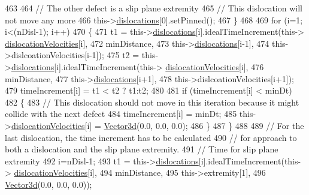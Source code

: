 \begin{DoxyCode}
463 
464        \textcolor{comment}{// The other defect is a slip plane extremity}
465        \textcolor{comment}{// This dislocation will not move any more}
466        this->\hyperlink{classSlipPlane_ad92c7c409f7e161db449528389180910}{dislocations}[0].setPinned();
467      \}
468 
469    \textcolor{keywordflow}{for} (i=1; i<(nDisl-1); i++)
470      \{
471        t1 = this->\hyperlink{classSlipPlane_ad92c7c409f7e161db449528389180910}{dislocations}[i].idealTimeIncrement(this->
      \hyperlink{classSlipPlane_a107a3883169bf918664cb4e4fd4bd72c}{dislocationVelocities}[i],
472                                                      minDistance,
473                                                      this->\hyperlink{classSlipPlane_ad92c7c409f7e161db449528389180910}{dislocations}[i-1],
474                                                      this->dislcoationVelocities[i-1]);
475        t2 = this->\hyperlink{classSlipPlane_ad92c7c409f7e161db449528389180910}{dislocations}[i].idealTimeIncrement(this->
      \hyperlink{classSlipPlane_a107a3883169bf918664cb4e4fd4bd72c}{dislocationVelocities}[i],
476                                                      minDistance,
477                                                      this->\hyperlink{classSlipPlane_ad92c7c409f7e161db449528389180910}{dislocations}[i+1],
478                                                      this->dislcoationVelocities[i+1]);
479        timeIncrement[i] = t1 < t2 ? t1:t2;
480 
481        \textcolor{keywordflow}{if} (timeIncrement[i] < minDt)
482          \{
483            \textcolor{comment}{// This dislocation should not move in this iteration because it might collide with the next
       defect}
484            timeIncrement[i] = minDt;
485            this->\hyperlink{classSlipPlane_a107a3883169bf918664cb4e4fd4bd72c}{dislocationVelocities}[i] = \hyperlink{classVector3d}{Vector3d}(0.0, 0.0, 0.0);
486          \}
487      \}
488 
489    \textcolor{comment}{// For the last dislocation, the time increment has to be calculated}
490    \textcolor{comment}{// for approach to both a dislocation and the slip plane extremity.}
491    \textcolor{comment}{// Time for slip plane extremity}
492    i=nDisl-1;
493    t1 = this->\hyperlink{classSlipPlane_ad92c7c409f7e161db449528389180910}{dislocations}[i].idealTimeIncrement(this->
      \hyperlink{classSlipPlane_a107a3883169bf918664cb4e4fd4bd72c}{dislocationVelocities}[i],
494                                                  minDistance,
495                                                  this->extremity[1],
496                                                  \hyperlink{classVector3d}{Vector3d}(0.0, 0.0, 0.0));

\end{DoxyCode}
